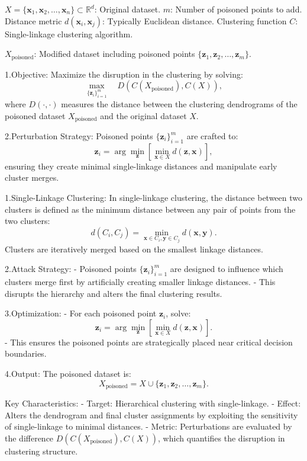 $X = \{\mathbf{x}_1, \mathbf{x}_2, \ldots, \mathbf{x}_n\} \subset \mathbb{R}^d$: Original dataset.
$m$: Number of poisoned points to add.
Distance metric $d(\mathbf{x}_i, \mathbf{x}_j)$: Typically Euclidean distance.
Clustering function $C$: Single-linkage clustering algorithm.

$X_{\text{poisoned}}$: Modified dataset including poisoned points $\{\mathbf{z}_1, \mathbf{z}_2, \ldots, \mathbf{z}_m\}$.

1.Objective: Maximize the disruption in the clustering by solving:
   \[
   \max_{\{\mathbf{z}_i\}_{i=1}^m} \quad D(C(X_{\text{poisoned}}), C(X)),
   \]
where $D(\cdot, \cdot)$ measures the distance between the clustering dendrograms of the poisoned dataset $X_{\text{poisoned}}$ and the original dataset $X$.

2.Perturbation Strategy: Poisoned points $\{\mathbf{z}_i\}_{i=1}^m$ are crafted to:
   \[
   \mathbf{z}_i = \arg \min_{\mathbf{z}} \left[ \min_{\mathbf{x} \in X} d(\mathbf{z}, \mathbf{x}) \right],
   \]
ensuring they create minimal single-linkage distances and manipulate early cluster merges.

1.Single-Linkage Clustering: In single-linkage clustering, the distance between two clusters is defined as the minimum distance between any pair of points from the two clusters:
     \[
     d(C_i, C_j) = \min_{\mathbf{x} \in C_i, \mathbf{y} \in C_j} d(\mathbf{x}, \mathbf{y}).
     \]
Clusters are iteratively merged based on the smallest linkage distances.

2.Attack Strategy:
- Poisoned points $\{\mathbf{z}_i\}_{i=1}^m$ are designed to influence which clusters merge first by artificially creating smaller linkage distances.
- This disrupts the hierarchy and alters the final clustering results.

3.Optimization:
- For each poisoned point $\mathbf{z}_i$, solve:
     \[
     \mathbf{z}_i = \arg \min_{\mathbf{z}} \left[ \min_{\mathbf{x} \in X} d(\mathbf{z}, \mathbf{x}) \right].
     \]
- This ensures the poisoned points are strategically placed near critical decision boundaries.

4.Output: The poisoned dataset is:
     \[
     X_{\text{poisoned}} = X \cup \{\mathbf{z}_1, \mathbf{z}_2, \ldots, \mathbf{z}_m\}.
     \]

Key Characteristics:
- Target: Hierarchical clustering with single-linkage.
- Effect: Alters the dendrogram and final cluster assignments by exploiting the sensitivity of single-linkage to minimal distances.
- Metric: Perturbations are evaluated by the difference $D(C(X_{\text{poisoned}}), C(X))$, which quantifies the disruption in clustering structure.
